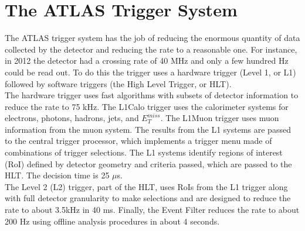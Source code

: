 

\section{The ATLAS Trigger System}

The ATLAS trigger system has the job of reducing the enormous quantity of data collected by the detector and reducing the rate to a reasonable one.  For instance, in 2012 the detector had a crossing rate of 40 MHz and only a few hundred Hz could be read out.  To do this the trigger uses a hardware trigger (Level 1, or L1) followed by software triggers (the High Level Trigger, or HLT).  \\

The hardware trigger uses fast algorithms with subsets of detector information to reduce the rate to 75 kHz.  The L1Calo trigger uses the calorimeter systems for electrons, photons, hadrons, jets, and $E_{T}^{miss}$.  The L1Muon trigger uses muon information from the muon system.  The results from the L1 systems are passed to the central trigger processor, which implements a trigger menu made of combinations of trigger selections.    The L1 systems identify regions of interest (RoI) defined by detector geometry and criteria passed, which are passed to the HLT.  The decision time is 25 $\mu$s. \\

The Level 2 (L2) trigger, part of the HLT, uses RoIs from the L1 trigger along with full detector granularity to make selections and are designed to reduce the rate to about 3.5kHz in 40 ms.  Finally, the Event Filter reduces the rate to about 200 Hz using offline analysis procedures in about 4 seconds.  \\

